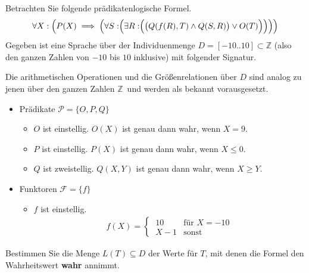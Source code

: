 \documentclass{uebungsblatt}
\begin{document}


\begin{aufgabe}
\medskip
Betrachten Sie folgende prädikatenlogische Formel.
\begin{align*}
\forall X:\Bigl(P(X)\implies\Bigl(\forall S:\Bigr(\exists R: \Bigr(\bigl(Q(f(R),T)\land Q(S,R)\bigr)\lor O(T)\Bigl)\Bigl)\Bigl)\Bigr)
\end{align*}
Gegeben ist eine Sprache über der Individuenmenge $D=[-10 .. 10]\subset \mathbb{Z}$
(also den ganzen Zahlen von $-10$ bis $10$ inklusive) mit folgender Signatur.

\smallskip
Die arithmetischen Operationen und die Größenrelationen über $D$ sind analog zu jenen
über den ganzen Zahlen $\mathbb{Z}$\ und werden als bekannt vorausgesetzt.
\begin{itemize}
    \item Prädikate $\mathcal{P}=\{O,P,Q\}$
    \begin{itemize}
        \item $O$ ist einstellig. $O(X)$ ist genau dann wahr, wenn $X=9$.
        \item $P$ ist einstellig. $P(X)$ ist genau dann wahr, wenn $X\leq 0$.
        \item $Q$ ist zweistellig. $Q(X,Y)$ ist genau dann wahr, wenn $X\geq Y$.
    \end{itemize}
    \item Funktoren $\mathcal{F} =\{f\}$
    \begin{itemize}
        \item $f$ ist einstellig. 
\begin{align*}
f(X) = \begin{cases}
\ 10 &\text{für } X = -10  \\
\ X-1 &\text{sonst}
\end{cases}
\end{align*}

    \end{itemize}
\end{itemize}
Bestimmen Sie die Menge $L(T)\subseteq D$ der Werte für $T$, mit denen die Formel den
Wahrheitswert \textbf{wahr} annimmt.\\


\end{aufgabe}
\end{document}
